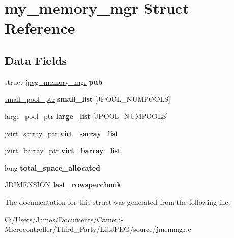 \hypertarget{structmy__memory__mgr}{}\section{my\+\_\+memory\+\_\+mgr Struct Reference}
\label{structmy__memory__mgr}
\subsection*{Data Fields}
\begin{DoxyCompactItemize}
\item 
\mbox{\label{structmy__memory__mgr_adc32d34c13f466e960f2e3f918db21ef}} 
struct \hyperlink{structjpeg__memory__mgr}{jpeg\+\_\+memory\+\_\+mgr} {\bfseries pub}
\item 
\mbox{\label{structmy__memory__mgr_a027f9cbf6f04efaa505a7e7f4ce0dc13}} 
\hyperlink{unionsmall__pool__struct}{small\+\_\+pool\+\_\+ptr} {\bfseries small\+\_\+list} \mbox{[}J\+P\+O\+O\+L\+\_\+\+N\+U\+M\+P\+O\+O\+LS\mbox{]}
\item 
\mbox{\label{structmy__memory__mgr_ac0a867cbe83336ca9e473ecf55bbf0b4}} 
large\+\_\+pool\+\_\+ptr {\bfseries large\+\_\+list} \mbox{[}J\+P\+O\+O\+L\+\_\+\+N\+U\+M\+P\+O\+O\+LS\mbox{]}
\item 
\mbox{\label{structmy__memory__mgr_a43ec1ef9eefa8f3672adc0b69ed59a68}} 
\hyperlink{structjvirt__sarray__control}{jvirt\+\_\+sarray\+\_\+ptr} {\bfseries virt\+\_\+sarray\+\_\+list}
\item 
\mbox{\label{structmy__memory__mgr_af6eb581781476c8c5357061843d61e29}} 
\hyperlink{structjvirt__barray__control}{jvirt\+\_\+barray\+\_\+ptr} {\bfseries virt\+\_\+barray\+\_\+list}
\item 
\mbox{\label{structmy__memory__mgr_a1cc606f35044027dbc68e9ad6615c8a3}} 
long {\bfseries total\+\_\+space\+\_\+allocated}
\item 
\mbox{\label{structmy__memory__mgr_ab9ad3bcc5de340c83b41de426c5c78e6}} 
J\+D\+I\+M\+E\+N\+S\+I\+ON {\bfseries last\+\_\+rowsperchunk}
\end{DoxyCompactItemize}


The documentation for this struct was generated from the following file\+:\begin{DoxyCompactItemize}
\item 
C\+:/\+Users/\+James/\+Documents/\+Camera-\/\+Microcontroller/\+Third\+\_\+\+Party/\+Lib\+J\+P\+E\+G/source/jmemmgr.\+c\end{DoxyCompactItemize}
